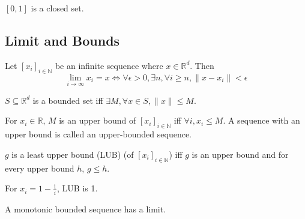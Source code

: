\begin{example} $[0, 1]$ is a closed set. \end{example}

\subsection{Limit and Bounds}

\begin{definition} Let $[x_i]_{i \in \mathbb{N}}$ be an infinite sequence
where $x \in \mathbb{R}^d$. Then
\[ \lim_{i \rightarrow \infty} x_i = x
\iff \forall \epsilon > 0, \exists n, \forall i \ge n, \|x - x_i\| < \epsilon \]
\end{definition}

\begin{definition} $S \subseteq \mathbb{R}^d$ is a bounded set
iff $\exists M, \forall x \in S, \|x\| \le M$. \end{definition}

\begin{definition} For $x_i \in \mathbb{R}$, $M$ is an upper bound of $[x_i]_{i \in \mathbb{N}}$
iff $\forall i, x_i \le M$. A sequence with an upper bound is called an upper-bounded sequence.
\end{definition}

\begin{definition} $g$ is a least upper bound (LUB) (of $[x_i]_{i \in \mathbb{N}}$) iff
$g$ is an upper bound and for every upper bound $h$, $g \le h$. \end{definition}

\begin{example} For $x_i = 1-\frac{1}{i}$, LUB is 1. \end{example}

\begin{theorem} A monotonic bounded sequence has a limit. \end{theorem}


